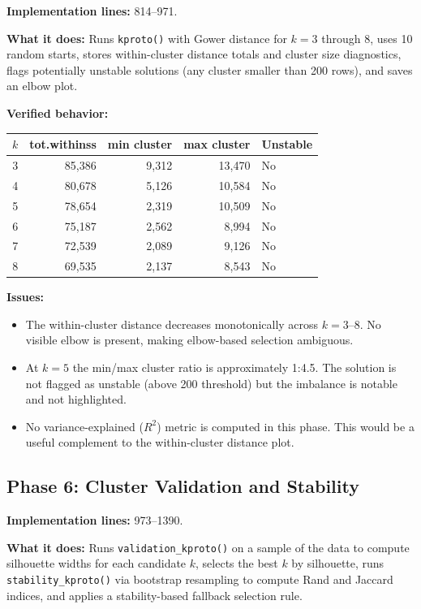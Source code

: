 \documentclass[11pt]{article}
\begin{document}
\textbf{Implementation lines:} 814--971.

\textbf{What it does:} Runs \texttt{kproto()} with Gower distance for
$k = 3$ through $8$, uses 10 random starts, stores within-cluster distance
totals and cluster size diagnostics, flags potentially unstable solutions
(any cluster smaller than 200 rows), and saves an elbow plot.

\textbf{Verified behavior:}

\begin{center}
\begin{tabular}{|c|r|r|r|l|}
\hline
$k$ & tot.withinss & min cluster & max cluster & Unstable \\
\hline
3 & 85{,}386 & 9{,}312 & 13{,}470 & No \\
4 & 80{,}678 & 5{,}126 & 10{,}584 & No \\
5 & 78{,}654 & 2{,}319 & 10{,}509 & No \\
6 & 75{,}187 & 2{,}562 & 8{,}994  & No \\
7 & 72{,}539 & 2{,}089 & 9{,}126  & No \\
8 & 69{,}535 & 2{,}137 & 8{,}543  & No \\
\hline
\end{tabular}
\end{center}

\textbf{Issues:}
\begin{itemize}
\item The within-cluster distance decreases monotonically across $k = 3$--$8$.
  No visible elbow is present, making elbow-based selection ambiguous.
\item At $k = 5$ the min/max cluster ratio is approximately 1:4.5. The solution
  is not flagged as unstable (above 200 threshold) but the imbalance is notable
  and not highlighted.
\item No variance-explained ($R^2$) metric is computed in this phase. This would
  be a useful complement to the within-cluster distance plot.
\end{itemize}

\subsection{Phase 6: Cluster Validation and Stability}
\label{sec:phase6}

\textbf{Implementation lines:} 973--1390.

\textbf{What it does:} Runs \texttt{validation\_kproto()} on a sample of the data
to compute silhouette widths for each candidate $k$, selects the best $k$ by
silhouette, runs \texttt{stability\_kproto()} via bootstrap resampling to compute
Rand and Jaccard indices, and applies a stability-based fallback selection rule.
\end{document}
